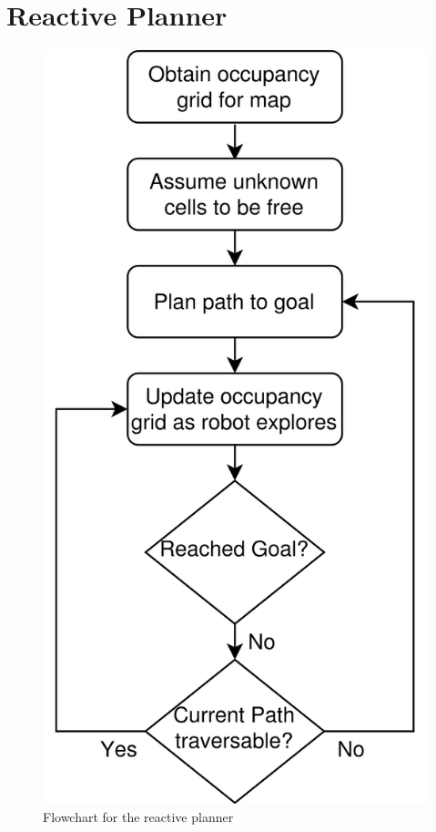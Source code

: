 \documentclass[a4paper,12pt]{article}
\begin{document}
	\pagebreak
	
	\tableofcontents
	
	\pagebreak
	
	\section{Reactive Planner}
		\begin{figure}[H]
			\centering
			\includegraphics[scale=0.15]{images/reactivePlannerFlowchart.png}
			\caption{Flowchart for the reactive planner}
			\label{reactivePlannerFlowchart}
		\end{figure}
	
\end{document}
